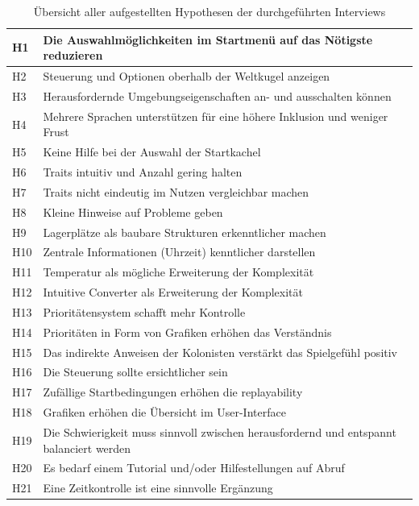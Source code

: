 \begin{table}[]
    \centering
    \caption{Übersicht aller aufgestellten Hypothesen der durchgeführten Interviews}
    \label{table:hypotheses}
    \begin{tabular}{|l|l|}
    \hline
    H1 & Die Auswahlmöglichkeiten im Startmenü auf das Nötigste reduzieren         \\ \hline
    H2 & Steuerung und Optionen oberhalb der Weltkugel anzeigen                    \\ \hline
    H3 & Herausfordernde Umgebungseigenschaften an- und ausschalten können         \\ \hline
    H4 & Mehrere Sprachen unterstützen für eine höhere Inklusion und weniger Frust \\ \hline
    H5 & Keine Hilfe bei der Auswahl der Startkachel                               \\ \hline
    H6 & Traits intuitiv und Anzahl gering halten                               \\ \hline
    H7 & Traits nicht eindeutig im Nutzen vergleichbar machen                               \\ \hline
    H8 & Kleine Hinweise auf Probleme geben                              \\ \hline
    H9 & Lagerplätze als baubare Strukturen erkenntlicher machen                              \\ \hline
    H10 & Zentrale Informationen (Uhrzeit) kenntlicher darstellen                             \\ \hline
    H11 & Temperatur als mögliche Erweiterung der Komplexität                             \\ \hline
    H12 & Intuitive Converter als Erweiterung der Komplexität                             \\ \hline
    H13 & Prioritätensystem schafft mehr Kontrolle                             \\ \hline
    H14 & Prioritäten in Form von Grafiken erhöhen das Verständnis                             \\ \hline
    H15 & Das indirekte Anweisen der Kolonisten verstärkt das Spielgefühl positiv                            \\ \hline
    H16 & Die Steuerung sollte ersichtlicher sein   \\ \hline
    H17 & Zufällige Startbedingungen erhöhen die replayability                            \\ \hline
    H18 & Grafiken erhöhen die Übersicht im User-Interface                            \\ \hline
    H19 & Die Schwierigkeit muss sinnvoll zwischen herausfordernd und entspannt balanciert werden                            \\ \hline
    H20 & Es bedarf einem Tutorial und/oder Hilfestellungen auf Abruf                            \\ \hline
    H21 & Eine Zeitkontrolle ist eine sinnvolle Ergänzung                            \\ \hline
    \end{tabular}
    \end{table}
